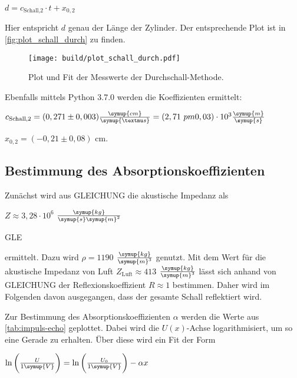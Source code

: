 \begin{center}
    $d = c_\text{Schall,2} \cdot t + x_{0,2}$
\end{center}

Hier entspricht $d$ genau der Länge der Zylinder. Der entsprechende Plot ist in \autoref{fig:plot_schall_durch} zu finden.

\begin{figure}
    \centering
    \texttt{[image: build/plot\_schall\_durch.pdf]}
    \caption{Plot und Fit der Messwerte der Durchschall-Methode.}
    \label{fig:plot_schall_durch}
\end{figure}

Ebenfalls mittels Python 3.7.0 werden die Koeffizienten ermittelt:

\begin{center}
    $c_\text{Schall,2} = (0,271 \pm 0,003) \frac{\symup{cm}}{\symup{µs}} = (2,71 \ pm 0,03) \cdot 10^{3} \frac{\symup{m}}{\symup{s}}$
    
    $x_{0,2} = (-0,21 \pm 0,08)$ cm.
\end{center}


\subsection{Bestimmung des Absorptionskoeffizienten}

Zunächst wird aus GLEICHUNG die akustische Impedanz als

\begin{center}
    $Z \approx 3,28 \cdot 10^{6}$ $\frac{\symup{kg}}{\symup{s}\symup{m}^2}$
\end{center}GLE

ermittelt. Dazu wird $\rho = 1190$ $\frac{\symup{kg}}{\symup{m}^3}$ \cite{pmma} genutzt. 
Mit dem Wert für die akustische Impedanz von Luft $Z_\text{Luft} \approx 413$ $\frac{\symup{kg}}{\symup{m}^3}$\cite{akImLuft} lässt sich anhand von GLEICHUNG der Reflexionskoeffizient $R \approx 1$ bestimmen.
Daher wird im Folgenden davon ausgegangen, dass der gesamte Schall reflektiert wird.

Zur Bestimmung des Absorptionskoeffizienten $\alpha$ werden die Werte aus \autoref{tab:impuls-echo} geplottet.
Dabei wird die $U(x)$-Achse logarithmisiert, um so eine Gerade zu erhalten.
Über diese wird ein Fit der Form

\begin{center}
    $\ln \bigg( \frac{U}{1 \symup{V}} \bigg) = \ln \bigg( \frac{U_0}{1 \symup{V}} \bigg) - \alpha x$
\end{center}


